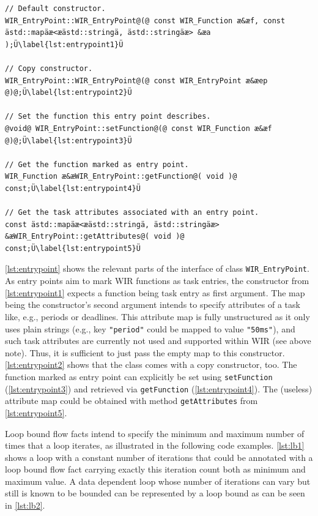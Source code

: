 \begin{lstlisting}[style=code,float=t,caption={Public Interface of Class \texttt{WIR\_EntryPoint}},label=lst:entrypoint]
// Default constructor.
WIR_EntryPoint::WIR_EntryPoint@(@ const WIR_Function æ&æf, const ästd::mapäæ<æästd::stringä, ästd::stringäæ> &æa );Ü\label{lst:entrypoint1}Ü

// Copy constructor.
WIR_EntryPoint::WIR_EntryPoint@(@ const WIR_EntryPoint æ&æep @)@;Ü\label{lst:entrypoint2}Ü

// Set the function this entry point describes.
@void@ WIR_EntryPoint::setFunction@(@ const WIR_Function æ&æf @)@;Ü\label{lst:entrypoint3}Ü

// Get the function marked as entry point.
WIR_Function æ&æWIR_EntryPoint::getFunction@( void )@ const;Ü\label{lst:entrypoint4}Ü

// Get the task attributes associated with an entry point.
const ästd::mapäæ<æästd::stringä, ästd::stringäæ> &æWIR_EntryPoint::getAttributes@( void )@ const;Ü\label{lst:entrypoint5}Ü
\end{lstlisting}

\cref{lst:entrypoint} shows the relevant parts of the interface of class \texttt{WIR\_EntryPoint}.
As entry points aim to mark \gls{WIR} functions as task entries, the constructor from \cref{lst:entrypoint1} expects a function being task entry as first argument.
The map being the constructor's second argument intends to specify attributes of a task like, e.g., periods or deadlines.
This attribute map is fully unstructured as it only uses plain strings (e.g., key \texttt{"period"} could be mapped to value \texttt{"50ms"}), and such task attributes are currently not used and supported within \gls{WIR} (see above note).
Thus, it is sufficient to just pass the empty map to this constructor.
\cref{lst:entrypoint2} shows that the class comes with a copy constructor, too.
The function marked as entry point can explicitly be set using \texttt{setFunction} (\cref{lst:entrypoint3}) and retrieved via \texttt{getFunction} (\cref{lst:entrypoint4}).
The (useless) attribute map could be obtained with method \texttt{getAttributes} from \cref{lst:entrypoint5}.

Loop bound flow facts intend to specify the minimum and maximum number of times that a loop iterates, as illustrated in the following code examples.
\cref{lst:lb1} shows a loop with a constant number of iterations that could be annotated with a loop bound flow fact carrying exactly this iteration count both as minimum and maximum value.
A data dependent loop whose number of iterations can vary but still is known to be bounded can be represented by a loop bound as can be seen in \cref{lst:lb2}.

